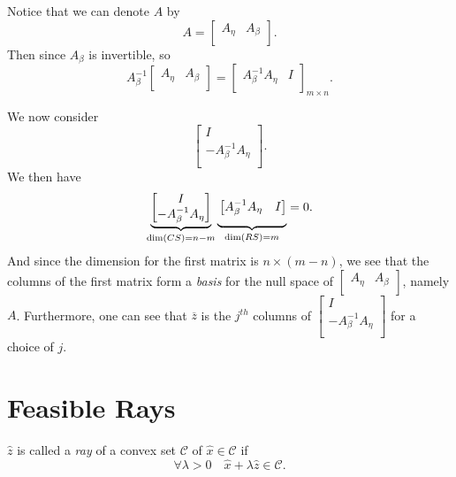 \begin{note}
	Notice that we can denote \(A\) by
	\[
		A = \begin{bmatrix}
			A_{\eta} & A_{\beta} \\
		\end{bmatrix}.
	\]
	Then since \(A_{\beta}\) is invertible, so
	\[
		A^{-1}_{\beta}\begin{bmatrix}
			A_{\eta} & A_{\beta} \\
		\end{bmatrix} = \begin{bmatrix}
			A^{-1}_{\beta}A_{\eta} & I \\
		\end{bmatrix}_{m\times n}.
	\]

	We now consider
	\[
		\begin{bmatrix}
			I                       \\
			-A^{-1}_{\beta}A_{\eta} \\
		\end{bmatrix}.
	\]
	We then have
	\[
		\underbrace{
			\begin{bmatrix}
				I                       \\
				-A^{-1}_{\beta}A_{\eta} \\
			\end{bmatrix}}_{\dim(CS) = n-m}\underbrace{\vphantom{\begin{bmatrix}
					\\ \\
				\end{bmatrix}}\begin{bmatrix}
				A^{-1}_{\beta}A_{\eta} & I \\
			\end{bmatrix}}_{\dim(RS)=m} = 0.
	\]
	And since the dimension for the first matrix is \(n\times (m-n)\), we see that the columns of the first matrix form a \emph{basis} for the null space of \(\begin{bmatrix}
		A_{\eta} & A_{\beta} \\
	\end{bmatrix}\), namely \(A\). Furthermore, one can see that \(\overline{z}\) is the \(j^{th}\) columns of \(\begin{bmatrix}
		I                       \\
		-A^{-1}_{\beta}A_{\eta} \\
	\end{bmatrix}\) for a choice of \(j\).
\end{note}

\section{Feasible Rays}
\begin{definition}
	\(\hat{z}\) is called a \emph{ray} of a convex set \(\mathcal{C}\) of \(\hat{x}\in \mathcal{C}\) if
	\[
		\forall \lambda>0\quad \hat{x} + \lambda \hat{z} \in \mathcal{C}.
	\]
\end{definition}


